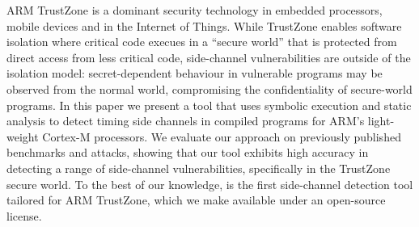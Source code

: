 ARM TrustZone is a dominant security technology in embedded processors,
mobile devices and in the Internet of Things. While TrustZone enables
software isolation where critical code execues in a ``secure world'' that
is protected from direct access from less critical code, side-channel
vulnerabilities are outside of the isolation model: secret-dependent
behaviour in vulnerable programs may be observed from the normal world,
compromising the confidentiality of secure-world programs. In this paper we
present a tool that uses symbolic execution and static analysis to detect
timing side channels in compiled programs for ARM's light-weight Cortex-M
processors. We evaluate our approach on previously published benchmarks and
attacks, showing that our tool \tool{} exhibits high accuracy in detecting
a range of side-channel vulnerabilities, specifically in the TrustZone
secure world. To the best of our knowledge, \tool{} is the first
side-channel detection tool tailored for ARM TrustZone, which we make
available under an open-source license.
